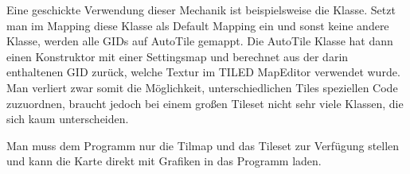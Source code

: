 Eine geschickte Verwendung dieser Mechanik ist beispielsweise die  Klasse. Setzt man im Mapping diese Klasse als Default Mapping ein und sonst keine andere Klasse, werden alle GIDs auf AutoTile gemappt. Die AutoTile Klasse hat dann einen Konstruktor mit einer Settingsmap und berechnet aus der darin enthaltenen GID zurück, welche Textur im TILED MapEditor verwendet wurde. Man verliert zwar somit die Möglichkeit, unterschiedlichen Tiles speziellen Code zuzuordnen, braucht jedoch bei einem großen Tileset nicht sehr viele Klassen, die sich kaum unterscheiden.

Man muss dem Programm nur die Tilmap und das Tileset zur Verfügung stellen und kann die Karte direkt mit Grafiken in das Programm laden.